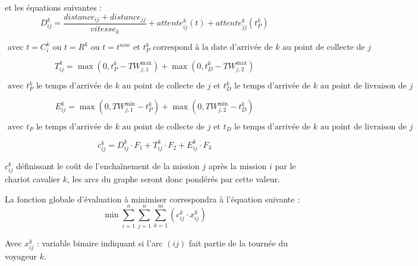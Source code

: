 et les équations suivantes : 
\begin{equation}
 \label{eq:distance}
  D^{k}_{ij} = \frac{distance_{ij}+distance_{jj}}{vitesse_k} + attente_{ij}^k(t) + attente_{jj}^k(t^k_P)
\end{equation}
\begin{center}
$\scriptstyle \text{ avec } t = C^k_i \text{ ou } t = R^k \text{ ou } t=t^{now} \text{ et } t^k_P \text{ correspond à la date d'arrivée de $k$ au point de collecte de } j$
\end{center}

\begin{equation}
 \label{eq:tardiness}
    T^k_{ij} = \max \left( 0 , t^k_P - TW_{j,1}^{\max} \right) +  \max \left( 0 , t^k_D - TW_{j,2}^{\max} \right)
\end{equation}
\begin{center}
  $\scriptstyle \text{ avec } t^k_P \text{ le temps d'arrivée de $k$ au point de collecte de } j \text{ et } t^k_D \text{ le temps d'arrivée de $k$ au point de livraison de } j$
\end{center}
 
\begin{equation}
\label{eq:earliness}
   E^{k}_{ij} = \max \left( 0 , TW_{j,1}^{\min} - t^k_P\right) + \max \left( 0 ,  TW_{j,2}^{\min} - t^k_D\right)
\end{equation}
\begin{center}
$\scriptstyle \text{ avec } t_P\text{ le temps d'arrivée de $k$ au point de collecte de } j \text{ et } t_D \text{ le temps d'arrivée de $k$ au point de livraison de } j$
\end{center}

\begin{equation}
  \label{eq:cost}
  c^k_{ij} = D^k_{ij} \cdot F_1 + T^k_{ij} \cdot F_2 + E^k_{ij} \cdot F_3
\end{equation}

$c^k_{ij}$ définissant le coût de l'enchaînement de la mission $j$ après la mission $i$ par le chariot cavalier $k$, les arcs du graphe seront donc pondérés par cette valeur.

La fonction globale d'évaluation à minimiser correspondra à l'équation suivante : 
\begin{equation}
  \min \sum \limits^{n}_{i=1} \sum \limits^{n}_{j=1} \sum \limits^{m}_{k=1} \left( c^k_{ij} \cdot x^k_{ij} \right)
\end{equation}
\begin{center}
 Avec $x^k_{ij}$ : variable binaire indiquant si l'arc $(ij)$ fait partie de la tournée du voyageur $k$.
\end{center}

